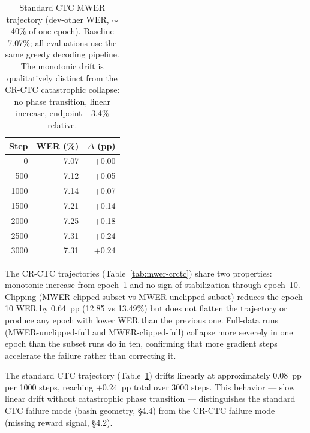 \begin{table}[h!]
\centering
\small
\caption{Standard CTC MWER trajectory (dev-other WER, ${\sim}$40\% of one epoch). Baseline
7.07\%; all evaluations use the same greedy decoding pipeline. The monotonic drift is qualitatively
distinct from the CR-CTC catastrophic collapse: no phase transition, linear increase, endpoint
+3.4\% relative.}
\label{tab:mwer-stdctc}
\begin{tabular}{rrr}
\hline
Step & WER (\%) & $\Delta$ (pp) \\
\hline
0    & 7.07 & $+$0.00 \\
500  & 7.12 & $+$0.05 \\
1000 & 7.14 & $+$0.07 \\
1500 & 7.21 & $+$0.14 \\
2000 & 7.25 & $+$0.18 \\
2500 & 7.31 & $+$0.24 \\
3000 & 7.31 & $+$0.24 \\
\hline
\end{tabular}
\end{table}

The CR-CTC trajectories (Table~\ref{tab:mwer-crctc}) share two properties: monotonic increase from
epoch~1 and no sign of stabilization through epoch~10. Clipping (MWER-clipped-subset vs MWER-unclipped-subset) reduces the
epoch-10 WER by 0.64~pp (12.85 vs 13.49\%) but does not flatten the trajectory or produce any
epoch with lower WER than the previous one. Full-data runs (MWER-unclipped-full and MWER-clipped-full) collapse more severely
in one epoch than the subset runs do in ten, confirming that more gradient steps accelerate the
failure rather than correcting it.

The standard CTC trajectory (Table~\ref{tab:mwer-stdctc}) drifts linearly at approximately
0.08~pp per 1000 steps, reaching $+$0.24~pp total over 3000 steps. This behavior — slow linear
drift without catastrophic phase transition — distinguishes the standard CTC failure mode (basin
geometry, §4.4) from the CR-CTC failure mode (missing reward signal, §4.2).
